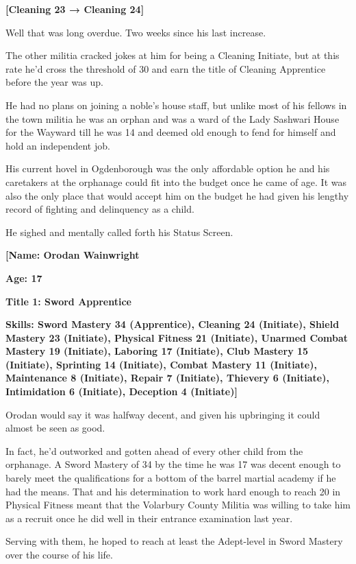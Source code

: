 \documentclass[a4paper,10pt]{book}
\begin{document}
\textbf{[Cleaning 23 → Cleaning 24]}\par
Well that was long overdue. Two weeks since his last increase.\par
The other militia cracked jokes at him for being a Cleaning Initiate, but at this rate he’d cross the threshold of 30 and earn the title of Cleaning Apprentice before the year was up.\par
He had no plans on joining a noble’s house staff, but unlike most of his fellows in the town militia he was an orphan and was a ward of the Lady Sashwari House for the Wayward till he was 14 and deemed old enough to fend for himself and hold an independent job.\par
His current hovel in Ogdenborough was the only affordable option he and his caretakers at the orphanage could fit into the budget once he came of age. It was also the only place that would accept him on the budget he had given his lengthy record of fighting and delinquency as a child.\par
He sighed and mentally called forth his Status Screen.\par
\textbf{[Name: Orodan Wainwright}\par
\textbf{Age: 17}\par
\textbf{Title 1: Sword Apprentice}\par
\textbf{Skills: Sword Mastery 34 (Apprentice), Cleaning 24 (Initiate), Shield Mastery 23 (Initiate), Physical Fitness 21 (Initiate), Unarmed Combat Mastery 19 (Initiate), Laboring 17 (Initiate), Club Mastery 15 (Initiate), Sprinting 14 (Initiate), Combat Mastery 11 (Initiate), Maintenance 8 (Initiate), Repair 7 (Initiate), Thievery 6 (Initiate), Intimidation 6 (Initiate), Deception 4 (Initiate)]}\par
Orodan would say it was halfway decent, and given his upbringing it could almost be seen as good.\par
In fact, he’d outworked and gotten ahead of every other child from the orphanage. A Sword Mastery of 34 by the time he was 17 was decent enough to barely meet the qualifications for a bottom of the barrel martial academy if he had the means. That and his determination to work hard enough to reach 20 in Physical Fitness meant that the Volarbury County Militia was willing to take him as a recruit once he did well in their entrance examination last year.\par
Serving with them, he hoped to reach at least the Adept-level in Sword Mastery over the course of his life.\par
\end{document}
